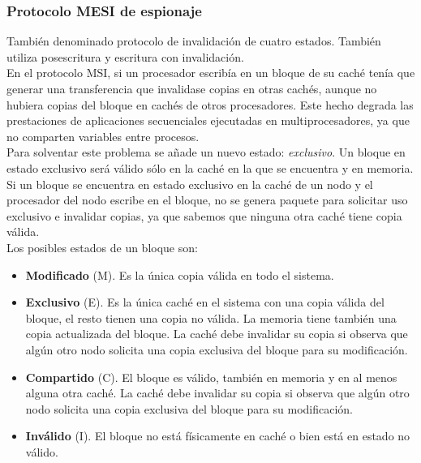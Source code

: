 \documentclass[12pt,spanish]{article}
\begin{document}
\subsubsection{Protocolo MESI de espionaje}

También denominado protocolo de invalidación de cuatro estados. También utiliza posescritura y escritura con invalidación.\\

En el protocolo MSI, si un procesador escribía en un bloque de su caché tenía que generar una transferencia que invalidase copias en otras cachés, aunque no hubiera copias del bloque en cachés de otros procesadores. Este hecho degrada las prestaciones de aplicaciones secuenciales ejecutadas en multiprocesadores, ya que no comparten variables entre procesos. \\

Para solventar este problema se añade un nuevo estado: \emph{exclusivo}. Un bloque en estado exclusivo será válido sólo en la caché en la que se encuentra y en memoria. Si un bloque se encuentra en estado exclusivo en la caché de un nodo y el procesador del nodo escribe en el bloque, no se genera paquete para solicitar uso exclusivo e invalidar copias, ya que sabemos que ninguna otra caché tiene copia válida.\\

Los posibles estados de un bloque son:

\begin{itemize}
	\item \textbf{Modificado} (M). Es la única copia válida en todo el sistema.
	\item \textbf{Exclusivo} (E). Es la única caché en el sistema con una copia válida del bloque, el resto tienen una copia no válida. La memoria tiene también una copia actualizada del bloque. La caché debe invalidar su copia si observa que algún otro nodo solicita una copia exclusiva del bloque para su modificación.
	\item \textbf{Compartido}  (C). El bloque es válido, también en memoria y en al menos alguna otra caché. La caché debe invalidar su copia si observa que algún otro nodo solicita una copia exclusiva del bloque para su modificación.
	\item \textbf{Inválido} (I). El bloque no está físicamente en caché o bien está en estado no válido.
\end{itemize}
\end{document}

